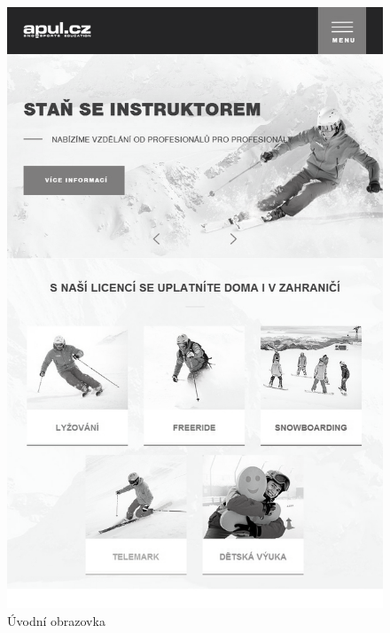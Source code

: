 \begin{figure}[h]
\centering
\includegraphics[scale=0.25]{images/screenshots/01.jpg}
\caption{Úvodní obrazovka}
\label{foto}
\end{figure}